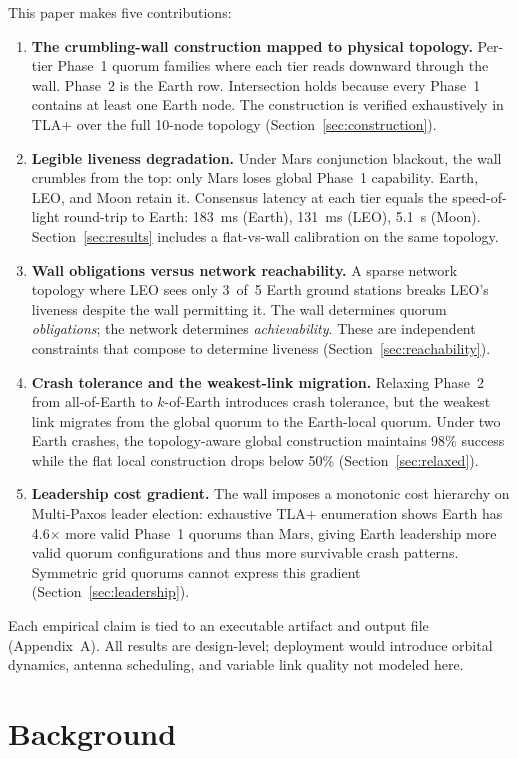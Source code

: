 \documentclass[11pt]{article}
\begin{document}
This paper makes five contributions:
\begin{enumerate}
\item \textbf{The crumbling-wall construction mapped to physical topology.} Per-tier Phase~1 quorum families where each tier reads downward through the wall. Phase~2 is the Earth row. Intersection holds because every Phase~1 contains at least one Earth node. The construction is verified exhaustively in TLA+ over the full 10-node topology (Section~\ref{sec:construction}).
\item \textbf{Legible liveness degradation.} Under Mars conjunction blackout, the wall crumbles from the top: only Mars loses global Phase~1 capability. Earth, LEO, and Moon retain it. Consensus latency at each tier equals the speed-of-light round-trip to Earth: 183~ms (Earth), 131~ms (LEO), 5.1~s (Moon). Section~\ref{sec:results} includes a flat-vs-wall calibration on the same topology.
\item \textbf{Wall obligations versus network reachability.} A sparse network topology where LEO sees only 3~of~5 Earth ground stations breaks LEO's liveness despite the wall permitting it. The wall determines quorum \emph{obligations}; the network determines \emph{achievability}. These are independent constraints that compose to determine liveness (Section~\ref{sec:reachability}).
\item \textbf{Crash tolerance and the weakest-link migration.} Relaxing Phase~2 from all-of-Earth to $k$-of-Earth introduces crash tolerance, but the weakest link migrates from the global quorum to the Earth-local quorum. Under two Earth crashes, the topology-aware global construction maintains 98\% success while the flat local construction drops below 50\% (Section~\ref{sec:relaxed}).
\item \textbf{Leadership cost gradient.} The wall imposes a monotonic cost hierarchy on Multi-Paxos leader election: exhaustive TLA+ enumeration shows Earth has 4.6$\times$ more valid Phase~1 quorums than Mars, giving Earth leadership more valid quorum configurations and thus more survivable crash patterns. Symmetric grid quorums cannot express this gradient (Section~\ref{sec:leadership}).
\end{enumerate}
Each empirical claim is tied to an executable artifact and output file (Appendix~A). All results are design-level; deployment would introduce orbital dynamics, antenna scheduling, and variable link quality not modeled here.


\section{Background}
\label{sec:background}
\end{document}
